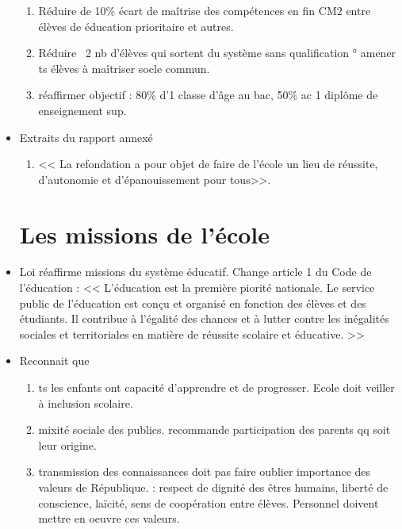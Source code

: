 \documentclass[12pt]{report}
\begin{document}
\begin{itemize}
\begin{enumerate}
\item Réduire de 10\% écart de maîtrise des compétences en fin CM2 entre élèves de éducation prioritaire et autres. \\

\item Réduire \ 2 nb d'élèves qui sortent du système sans qualification ° amener ts élèves à maîtriser socle commun. \\

\item réaffirmer objectif : 80\% d'1 classe d'âge au bac, 50\% ac 1 diplôme de enseignement sup.
\end{enumerate}

\item Extraits du rapport annexé
\begin{enumerate}
\item << La refondation a pour objet de faire de l'école un lieu de réussite, d'autonomie et d'épanouissement pour tous>>.
\end{enumerate}

\section{Les missions de l'école}

\item Loi réaffirme missions du système éducatif. Change article 1 du Code de l'éducation : << L'éducation est la première piorité nationale. Le service public de l'éducation est conçu et organisé en fonction des élèves et des étudiants. Il contribue à l'égalité des chances et à lutter contre les inégalités sociales et territoriales en matière de réussite scolaire et éducative. >> \\

\item Reconnait que 
\begin{enumerate}
\item ts les enfants ont capacité d'apprendre et de progresser. Ecole doit veiller à inclusion scolaire. \\
\item mixité sociale des publics. recommande participation des parents qq soit leur origine. \\
\item transmission des connaissances doit pas faire oublier importance des valeurs de République. : respect de dignité des êtres humains, liberté de conscience, laïcité, sens de coopération entre élèves. Personnel doivent mettre en oeuvre ces valeurs. \\
\end{enumerate}


\end{itemize}
\end{document}
